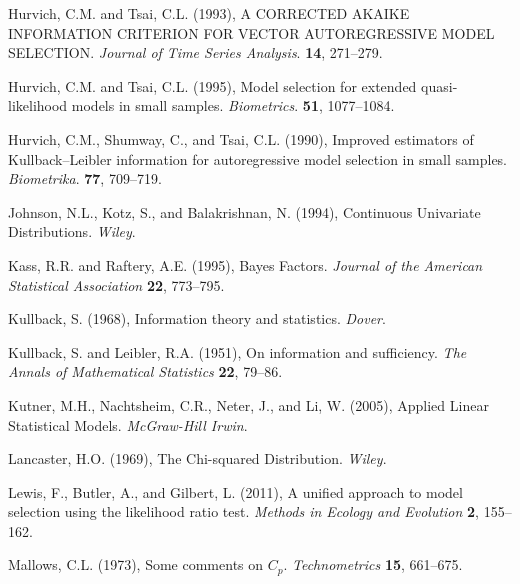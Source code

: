 \phantom{a}

\rff Hurvich, C.M. and Tsai, C.L. (1993),
      A CORRECTED AKAIKE INFORMATION CRITERION FOR VECTOR AUTOREGRESSIVE MODEL SELECTION.
      {\it Journal of Time Series Analysis}.
      {\bf 14}, {271--279}.

\phantom{a}

\rff Hurvich, C.M. and Tsai, C.L. (1995),
      Model selection for extended quasi-likelihood models in small samples.
      {\it Biometrics}.
      {\bf 51}, {1077--1084}.

\phantom{a}

\rff Hurvich, C.M., Shumway, C., and Tsai, C.L. (1990),
      Improved estimators of Kullback–Leibler information for autoregressive model selection in small samples.
      {\it Biometrika}.
      {\bf 77}, {709--719}.

\phantom{a}

\rff Johnson, N.L., Kotz, S., and Balakrishnan, N. (1994),
      Continuous Univariate Distributions.
      {\it Wiley}.

\phantom{a}

\rff Kass, R.R. and Raftery, A.E. (1995),
     Bayes Factors.
     {\it Journal of the American Statistical Association}
     {\bf 22}, {773--795}.

\phantom{a}

\rff Kullback, S. (1968),
      Information theory and statistics.
      {\it Dover}.

\phantom{a}

\rff Kullback, S. and Leibler, R.A. (1951),
     On information and sufficiency.
     {\it The Annals of Mathematical Statistics}
     {\bf 22}, {79--86}.

\phantom{a}

\rff Kutner, M.H., Nachtsheim, C.R., Neter, J., and Li, W. (2005),
      Applied Linear Statistical Models.
      {\it McGraw-Hill Irwin}.

\phantom{a}

\rff Lancaster, H.O. (1969),
      The Chi-squared Distribution.
     {\it Wiley}.

\phantom{a}

\rff Lewis, F., Butler, A., and Gilbert, L. (2011),
      A unified approach to model selection using the likelihood ratio test.
      {\it Methods in Ecology and Evolution}
      {\bf 2}, {155--162}.

\phantom{a}

\rff Mallows, C.L. (1973),
      Some comments on $C_p$.
      {\it Technometrics}
      {\bf 15}, {661--675}.


